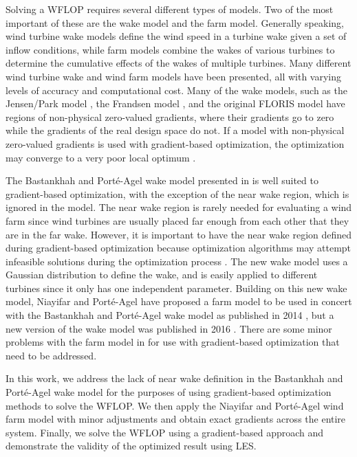 \documentclass[conf]{new-aiaa}
\begin{document}
Solving a WFLOP requires several different types of models. Two of the most important of these are the wake model and the farm model. Generally speaking, wind turbine wake models define the wind speed in a turbine wake given a set of inflow conditions, while farm models combine the wakes of various turbines to determine the cumulative effects of the wakes of multiple turbines. Many different wind turbine wake and wind farm models have been presented, all with varying levels of accuracy and computational cost. Many of the wake models, such as the Jensen/Park model \cite{jensen1983}, the Frandsen model \cite{frandsen2006}, and the original FLORIS model \cite{gebraad2014} have regions of non-physical zero-valued gradients, where their gradients go to zero while the gradients of the real design space do not. If a model with non-physical zero-valued gradients is used with gradient-based optimization, the optimization may converge to a very poor local optimum \cite{thomas2017}.

The Bastankhah and Port\'{e}-Agel wake model presented in \cite{bastankhah2014, bastankhah2016} is well suited to gradient-based optimization, with the exception of the near wake region, which is ignored in the model. The near wake region is rarely needed for evaluating a wind farm since wind turbines are usually placed far enough from each other that they are in the far wake. However, it is important to have the near wake region defined during gradient-based optimization because optimization algorithms may attempt infeasible solutions during the optimization process \cite{belegundu2011}. The new wake model uses a Gaussian distribution to define the wake, and is easily applied to different turbines since it only has one independent parameter. Building on this new  wake model, Niayifar and Port\'{e}-Agel have proposed a farm model  \cite{niayifar2015, niayifar2016} to be used in concert with the Bastankhah and Port\'{e}-Agel wake model as published in 2014 \cite{bastankhah2014}, but a new version of the wake model was published in 2016 \cite{bastankhah2016}. There are some minor problems with the farm model in \cite{niayifar2016} for use with gradient-based optimization that need to be addressed.

In this work, we address the lack of near wake definition in the Bastankhah and Port\'{e}-Agel wake model for the purposes of using gradient-based optimization methods to solve the WFLOP. We then apply the Niayifar and Port\'{e}-Agel wind farm model with minor adjustments and obtain exact gradients across the entire system. Finally, we solve the WFLOP using a gradient-based approach and demonstrate the validity of the optimized result using LES.
\end{document}
